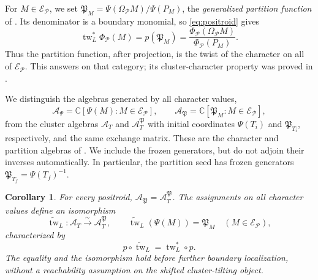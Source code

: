 \documentclass[11pt]{amsart}
\numberwithin{equation}{section}
\newtheorem{corollary}[theorem]{Corollary}
\theoremstyle{definition}
\theoremstyle{remark}
\newcommand{\op}[1]{\operatorname{#1}}
\newcommand{\E}{\mathcal E}
\newcommand{\Pcal}{\mathcal P}
\newcommand{\kk}{\mathbb C}
\newcommand{\tw}{\op{tw}}
\begin{document}
For $M\in\E_\Pcal$, we set
$\mathfrak P_M=\Psi(\Omega_\Pcal M)/\Psi(P_M)$, the
\emph{generalized partition function} of \cite[equation~(7.6)]{JRS26}.
Its denominator is a boundary monomial, so \eqref{eq:positroid} gives
\begin{equation}\label{eq:partition-image} \tw_L^*\Phi_\Pcal(M)=p(\mathfrak P_M)=\frac{\Phi_\Pcal(\Omega_\Pcal M)}{\Phi_\Pcal(P_M)}.\end{equation}
Thus the partition function, after projection, is the twist of the
character on all of $\E_\Pcal$. This answers
\cite[Remark~7.7]{JRS26} on that category; its cluster-character
property was proved in \cite[Proposition~7.6]{JRS26}.

We distinguish the algebras generated by all character values,
\[ \mathscr A_\Psi=\kk[\Psi(M):M\in\E_\Pcal],\qquad \mathscr A_{\mathfrak P}=\kk[\mathfrak P_M:M\in\E_\Pcal], \]
from the cluster algebras $\mathcal A_T$ and
$\mathcal A_T^{\mathfrak P}$ with initial coordinates $\Psi(T_i)$
and $\mathfrak P_{T_i}$, respectively, and the same exchange matrix.
These are the character and partition algebras of
\cite[Section~7.4]{JRS26}. We include the frozen generators, but do not
adjoin their inverses automatically. In particular, the partition seed
has frozen generators $\mathfrak P_{T_f}=\Psi(T_f)^{-1}$.

\begin{corollary}\label{cor:partition-algebra}
For every positroid, $\mathscr A_{\mathfrak P}=\mathcal A_T^{\mathfrak P}$.
The assignments on all character values define an isomorphism
\[ \widetilde{\tw}_L:\mathcal A_T\xrightarrow{\sim}\mathcal A_T^{\mathfrak P},\qquad \widetilde{\tw}_L(\Psi(M))=\mathfrak P_M\quad(M\in\E_\Pcal), \]
characterized by
\begin{equation}\label{eq:partition-intertwining} p\circ\widetilde{\tw}_L=\tw_L^*\circ p.\end{equation}
The equality and the isomorphism hold before further boundary localization,
without a reachability assumption on the shifted cluster-tilting object.
\end{corollary}
\end{document}
